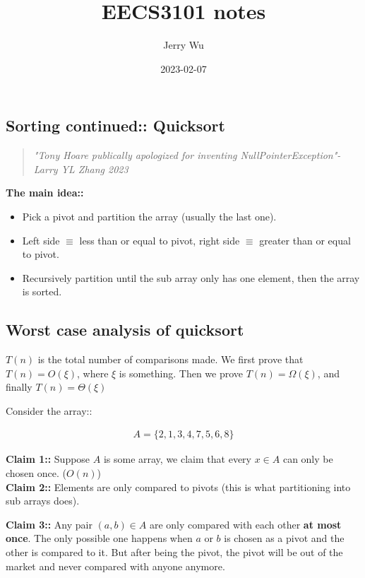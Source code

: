\documentclass[12pt]{article}
\title{EECS3101 notes}
\author{Jerry Wu}
\date{2023-02-07}
\begin{document}
\maketitle

\subsection*{Sorting continued:: Quicksort}

\begin{quote}
    \textit{"Tony Hoare publically apologized for inventing NullPointerException"-Larry YL Zhang 2023}
\end{quote}

\textbf{The main idea::}
\begin{itemize}
    \item Pick a pivot and partition the array (usually the last one).
    \item Left side $\equiv$ less than or equal to pivot, right side $\equiv$ greater than or equal to pivot.
    \item Recursively partition until the sub array only has one element, then the array is sorted.
\end{itemize}

\subsection*{Worst case analysis of quicksort}

$T(n)$ is the total number of comparisons made. We first prove that $T(n)=O(\xi)$, where $\xi$ is something. Then we prove $T(n)=\Omega(\xi)$, and finally $T(n)=\Theta(\xi)$

Consider the array::

\begin{align*}
    A=\{2,1,3,4,7,5,6,8\}
\end{align*}

\textbf{Claim 1::} Suppose $A$ is some array, we claim that every $x\in A$ can only be chosen once. ($O(n)$)\\

\textbf{Claim 2::} Elements are only compared to pivots (this is what partitioning into sub arrays does).

\textbf{Claim 3::} Any pair $(a,b)\in A$ are only compared with each other \textbf{at most once}. The only possible one happens when $a$ or $b$ is chosen as a pivot and the other is compared to it. But after being the pivot, the pivot will be out of the market and never compared with anyone anymore.
\end{document}
